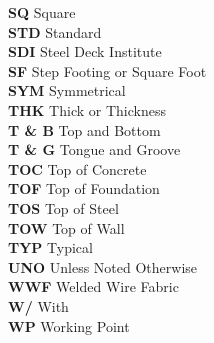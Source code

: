 \begin{tabbing}
    \indent\textbf{SQ}       \>  {Square}\\
    \indent\textbf{STD}      \>  {Standard}\\
    \indent\textbf{SDI}      \>  {Steel Deck Institute}\\
    \indent\textbf{SF}       \>  {Step Footing or Square Foot}\\
    \indent\textbf{SYM}      \>  {Symmetrical}\\
    \indent\textbf{THK}      \>  {Thick or Thickness}\\
    \indent\textbf{T \& B}   \>  {Top and Bottom}\\
    \indent\textbf{T \& G}   \>  {Tongue and Groove}\\
    \indent\textbf{TOC}      \>  {Top of Concrete}\\
    \indent\textbf{TOF}      \>  {Top of Foundation}\\
    \indent\textbf{TOS}      \>  {Top of Steel}\\
    \indent\textbf{TOW}      \>  {Top of Wall}\\
    \indent\textbf{TYP}      \>  {Typical}\\
    \indent\textbf{UNO}      \>  {Unless Noted Otherwise}\\
    \indent\textbf{WWF}      \>  {Welded Wire Fabric}\\
    \indent\textbf{W/}       \>  {With}\\
    \indent\textbf{WP}       \>  {Working Point}\\
\end{tabbing}

